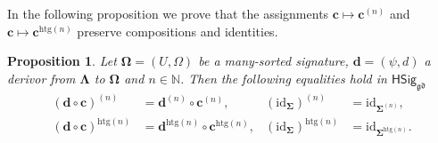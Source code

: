 \documentclass[a4paper, reqno]{amsbook}
\newcommand{\sig}[1]{\mathbf{#1}}             %
\newcommand{\gd}{\mathfrak{gd}}              %
\newcommand{\htg}{\mathrm{htg}}                %
\newcommand{\id}{\mathrm{id}}
\theoremstyle{plain}
\newtheorem{proposition}[theorem]{Proposition}
\theoremstyle{definition}
\begin{document}
In the following proposition we prove that the assignments $\mathbf{c}\mapsto\mathbf{c}^{(n)}$ and $\mathbf{c}\mapsto\mathbf{c}^{\htg(n)}$ preserve compositions and identities.

\begin{proposition}\label{PChangeSigDerivorComp}
Let $\sig{\Omega}=(U,\Omega)$ be a many-sorted signature, $\mathbf{d}=(\psi,d)$ a derivor from $\sig{\Lambda}$ to $\sig{\Omega}$ and $n\in\mathbb{N}$.
Then the following equalities hold in $\mathsf{HSig}_{\gd}$
\begin{align*}
(\mathbf{d}\circ\mathbf{c})^{(n)}&=\mathbf{d}^{(n)}\circ\mathbf{c}^{(n)},
&
(\id_{\sig{\Sigma}})^{(n)}&=\id_{\sig{\Sigma}^{(n)}},
\\
(\mathbf{d}\circ\mathbf{c})^{\htg(n)}&=\mathbf{d}^{\htg(n)}\circ\mathbf{c}^{\htg(n)},
&
(\id_{\sig{\Sigma}})^{\htg(n)}&=\id_{\sig{\Sigma}^{\htg(n)}}.
\end{align*}
\end{proposition}
\end{document}
